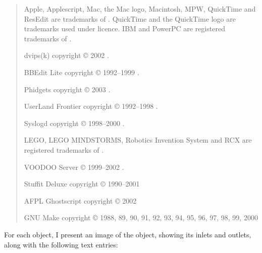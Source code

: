 \begin{quote}
\begin{small}
Apple, Applescript, Mac, the Mac logo, Macintosh, MPW, QuickTime and ResEdit are trademarks of
.
QuickTime and the QuickTime logo are trademarks used under licence.
IBM and PowerPC are registered trademarks of .

dvips(k) copyright \copyright{} 2002 .

BBEdit Lite copyright \copyright{} 1992--1999 .

Phidgets copyright \copyright{} 2003 .

UserLand Frontier copyright \copyright{} 1992--1998 .

Syslogd copyright \copyright{} 1998--2000 .

LEGO, LEGO MINDSTORMS, Robotics Invention System and RCX are registered trademarks of
.

VOODOO Server \copyright{} 1999--2002 .

Stuffit Deluxe copyright \copyright{} 1990--2001 

AFPL Ghostscript copyright \copyright{} 2002 

GNU Make copyright \copyright{} 1988, 89, 90, 91, 92, 93, 94, 95, 96, 97, 98, 99, 2000

\end{small}
\end{quote}
For each object, I present an image of the object, showing its inlets and outlets, along with the following text entries:
